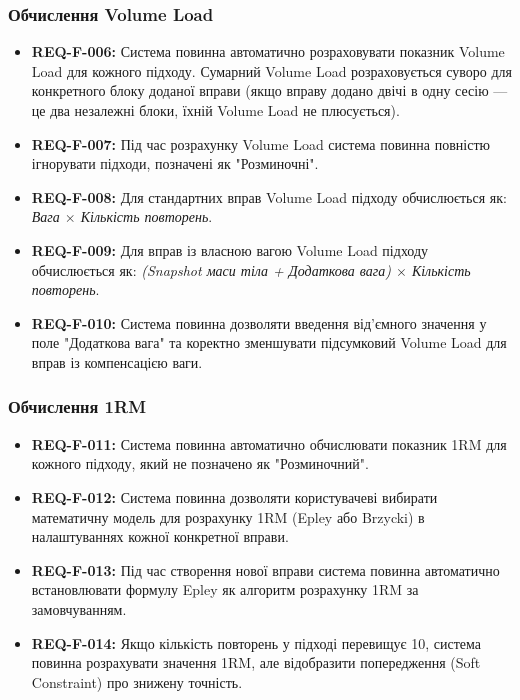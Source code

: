 \documentclass[12pt]{article}
\begin{document}
\subsubsection*{Обчислення Volume Load}
\begin{itemize}
    \item \textbf{REQ-F-006:} Система повинна автоматично розраховувати показник Volume Load для кожного підходу. Сумарний Volume Load розраховується суворо для конкретного блоку доданої вправи (якщо вправу додано двічі в одну сесію — це два незалежні блоки, їхній Volume Load не плюсується).
    \item \textbf{REQ-F-007:} Під час розрахунку Volume Load система повинна повністю ігнорувати підходи, позначені як "Розминочні".
    \item \textbf{REQ-F-008:} Для стандартних вправ Volume Load підходу обчислюється як: \textit{Вага $\times$ Кількість повторень}.
    \item \textbf{REQ-F-009:} Для вправ із власною вагою Volume Load підходу обчислюється як: \textit{(Snapshot маси тіла + Додаткова вага) $\times$ Кількість повторень}.
    \item \textbf{REQ-F-010:} Система повинна дозволяти введення від'ємного значення у поле "Додаткова вага" та коректно зменшувати підсумковий Volume Load для вправ із компенсацією ваги.
\end{itemize}

\subsubsection*{Обчислення 1RM}
\begin{itemize}
    \item \textbf{REQ-F-011:} Система повинна автоматично обчислювати показник 1RM для кожного підходу, який не позначено як "Розминочний".
    \item \textbf{REQ-F-012:} Система повинна дозволяти користувачеві вибирати математичну модель для розрахунку 1RM (Epley або Brzycki) в налаштуваннях кожної конкретної вправи.
    \item \textbf{REQ-F-013:} Під час створення нової вправи система повинна автоматично встановлювати формулу Epley як алгоритм розрахунку 1RM за замовчуванням.
    \item \textbf{REQ-F-014:} Якщо кількість повторень у підході перевищує 10, система повинна розрахувати значення 1RM, але відобразити попередження (Soft Constraint) про знижену точність.
\end{itemize}
\end{document}
